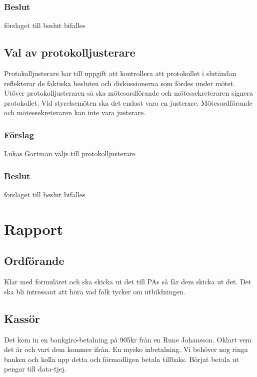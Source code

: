 \documentclass[protokoll]{dvd}
\begin{document}
\subsubsection*{Beslut}
\begin{attsatser}
    \item förslaget till beslut bifalles
\end{attsatser}

\subsection{Val av protokolljusterare}

Protokolljusterare har till uppgift att kontrollera att protokollet i slutändan reflekterar de faktiska besluten och diskussionerna som fördes under mötet.
Utöver protokolljusteraren så ska mötesordförande och mötessekreteraren signera protokollet.
Vid styrelsemöten ska det endast vara en justerare.
Mötesordförande och mötessekreteraren kan inte vara justerare.

\subsubsection*{Förslag}
\begin{attsatser}
    \item Lukas Gartman väljs till protokolljusterare
\end{attsatser}
\subsubsection*{Beslut}
\begin{attsatser}
    \item förslaget till beslut bifalles
\end{attsatser}

\section{Rapport}
\subsection{Ordförande}
Klar med formuläret och ska skicka ut det till PAs så får dem skicka ut det. Det ska bli intressant att höra vad folk tycker om utbildningen.

\subsection{Kassör}
Det kom in en bankgiro-betalning på 905kr från en Rune Johansson. Oklart vem det är och vart dem kommer ifrån. En mysko inbetalning. Vi behöver nog ringa banken och kolla upp detta och förmodligen betala tillbaks.
Börjat betala ut pengar till data-tjej.
\end{document}

